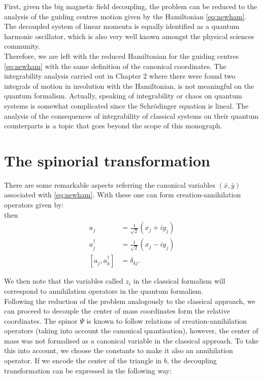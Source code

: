 First, given the big magnetic field decoupling, the problem can be reduced to the analysis of the guiding centres motion given by the Hamiltonian \eqref{eq:newham}. The decoupled system of linear momenta is equally identified as a quantum harmonic oscillator, which is also very well known amongst the physical sciences community.\\


Therefore, we are left with the reduced Hamiltonian for the guiding centres \eqref{eq:newham} with the same definition of the canonical coordinates. The integrability analysis carried out in Chapter 2 where there were found two integrals of motion in involution with the Hamiltonian, is not meaningful on the quantum formalism. Actually, speaking of integrability or chaos on quantum systems is somewhat complicated since the Schr\"odinger equation is lineal. The analysis of the consequences of integrability of classical systems on their quantum counterparts is a topic that goes beyond the scope of this monograph.\\


\section{The spinorial transformation}
There are some remarkable aspects referring the canonical variables $(\bar{x},\bar{y})$ associated with \eqref{eq:newham}. With these one can form creation-annihilation operators given by:\\
 then 
\begin{align*}
a_j &= \frac{1}{\sqrt{2}}(x_j+iy_j)\\
a_j^\dagger &= \frac{1}{\sqrt{2}}(x_j-iy_j)\\
\left[a_j,a_k^\dagger\right] &= \delta_{kj}.
\end{align*}

We then note that the variables called $z_i$ in the classical formalism will correspond to annihilation operators in the quantum formalism.\\

Following the reduction of the problem analogously to the classical approach, we can proceed to decouple the center of mass coordinates form the relative coordinates. The spinor $\Psi$ is known to follow relations of creation-annihilation operators (taking into account the canonical quantisation), however, the center of mass was not formalised as a canonical variable in the classical approach. To take this into account, we choose the constants to make it also an annihilation operator. If we encode the center of the triangle in $b$, the decoupling transformation can be expressed in the following way:\\

